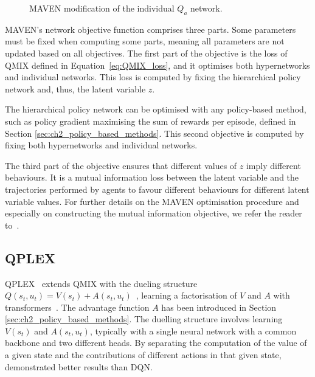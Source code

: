 \begin{figure}
\centering

\caption{MAVEN modification of the individual $Q_a$ network.}
\label{fig:maven}
\end{figure}

MAVEN's network objective function comprises three parts.
Some parameters must be fixed when computing some parts, meaning all parameters are not updated based on all objectives.
The first part of the objective is the loss of QMIX defined in Equation~\ref{eq:QMIX_loss}, and it optimises both hypernetworks and individual networks.
This loss is computed by fixing the hierarchical policy network and, thus, the latent variable $z$.

The hierarchical policy network can be optimised with any policy-based method, such as policy gradient maximising the sum of rewards per episode, defined in Section \ref{sec:ch2_policy_based_methods}.
This second objective is computed by fixing both hypernetworks and individual networks.

The third part of the objective ensures that different values of $z$ imply different behaviours. 
It is a mutual information loss between the latent variable and the trajectories performed by agents to favour different behaviours for different latent variable values.
For further details on the MAVEN optimisation procedure and especially on constructing the mutual information objective, we refer the reader to~\cite{Mahajan2019MAVEN:Exploration}.

\subsection{QPLEX}
QPLEX~\citep{wang2021qplex} extends QMIX with the dueling structure $Q(s_t, u_t) = V(s_t) + A(s_t, u_t)$~\citep{wang2016dueling}, learning a factorisation of $V$ and $A$ with transformers~\citep{vaswani2017attention}.
The advantage function $A$ has been introduced in Section \ref{sec:ch2_policy_based_methods}.
The duelling structure involves learning $V(s_t)$ and $A(s_t, u_t)$, typically with a single neural network with a common backbone and two different heads.
By separating the computation of the value of a given state and the contributions of different actions in that given state,~\citet{wang2016dueling} demonstrated better results than DQN.

